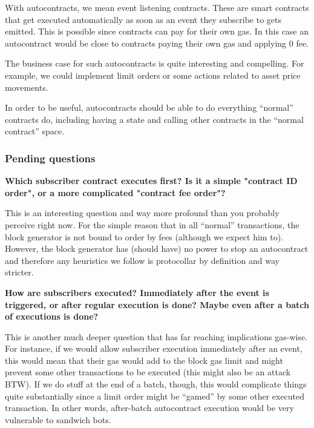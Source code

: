 \documentclass[twocolumn, nofootinbib]{revtex4-2} %
\begin{document}
    With autocontracts, we mean event listening contracts.
    These are smart contracts that get executed automatically as soon as an
    event they subscribe to gets emitted.
    This is possible since contracts can pay for their own gas.
    In this case an autocontract would be close to contracts paying their own
    gas and applying 0 fee.

    The business case for such autocontracts is quite interesting and
    compelling.
    For example, we could implement limit orders or some actions related to
    asset price movements.

    In order to be useful, autocontracts should be able to do everything
    ``normal'' contracts do, including having a state and calling other
    contracts in the ``normal contract'' space.

    \subsubsection{Pending questions}\label{sec:specifications:scenario-5:pending-questions}
    \textbf{Which subscriber contract executes first? Is it a simple "contract
            ID order", or a more complicated "contract fee order"?}

    This is an interesting question and way more profound than you probably
    perceive right now.
    For the simple reason that in all ``normal'' transactions, the block
    generator is not bound to order by fees (although we expect him to).
    However, the block generator has (should have) no power to stop an
    autocontract and therefore any heuristics we follow is protocollar by
    definition and way stricter.

    \textbf{How are subscribers executed? Immediately after the event is
    triggered, or after regular execution is done? Maybe even after a batch of
    executions is done?}

    This is another much deeper question that has far reaching implications
    gas-wise.
    For instance, if we would allow subscriber execution immediately after an
    event, this would mean that their gas would add to the block gas limit and
    might prevent some other transactions to be executed (this might also be an
    attack BTW). If we do stuff at the end of a batch, though, this would
    complicate things quite substantially since a limit order might be
    ``gamed'' by some other executed transaction.
    In other words, after-batch autocontract execution would be very vulnerable
    to sandwich bots.
\end{document}

